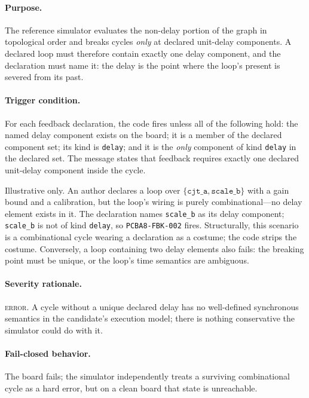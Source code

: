 \paragraph{Purpose.} The reference simulator evaluates the non-delay portion of the graph in topological order and breaks cycles \emph{only} at declared unit-delay components. A declared loop must therefore contain exactly one delay component, and the declaration must name it: the delay is the point where the loop's present is severed from its past.

\paragraph{Trigger condition.} For each feedback declaration, the code fires unless all of the following hold: the named delay component exists on the board; it is a member of the declared component set; its kind is \texttt{delay}; and it is the \emph{only} component of kind \texttt{delay} in the declared set. The message states that feedback requires exactly one declared unit-delay component inside the cycle.

\begin{example}\label{ch07:ex:fbk002}
Illustrative only. An author declares a loop over $\{\texttt{cjt\_a}, \texttt{scale\_b}\}$ with a gain bound and a calibration, but the loop's wiring is purely combinational---no delay element exists in it. The declaration names \texttt{scale\_b} as its delay component; \texttt{scale\_b} is not of kind \texttt{delay}, so \texttt{PCBA8-FBK-002} fires. Structurally, this scenario is a combinational cycle wearing a declaration as a costume; the code strips the costume. Conversely, a loop containing two delay elements also fails: the breaking point must be unique, or the loop's time semantics are ambiguous.
\end{example}

\paragraph{Severity rationale.} \textsc{error}. A cycle without a unique declared delay has no well-defined synchronous semantics in the candidate's execution model; there is nothing conservative the simulator could do with it.

\paragraph{Fail-closed behavior.} The board fails; the simulator independently treats a surviving combinational cycle as a hard error, but on a clean board that state is unreachable.

